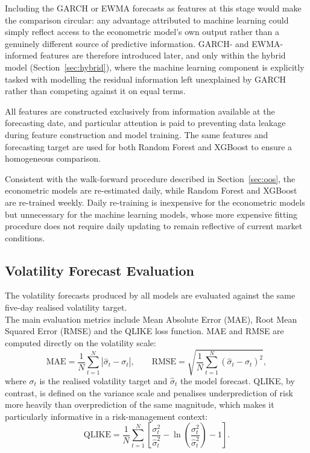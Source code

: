 \documentclass[12pt,a4paper]{article}
\begin{document}
Including the GARCH or EWMA forecasts as features at this stage would make the comparison circular:
any advantage attributed to machine learning could simply reflect access to the econometric model's
own output rather than a genuinely different source of predictive information. GARCH- and
EWMA-informed features are therefore introduced later, and only within the hybrid model
(Section~\ref{sec:hybrid}), where the machine learning component is explicitly tasked with modelling
the residual information left unexplained by GARCH rather than competing against it on equal terms.

All features are constructed exclusively from information available at the forecasting date, and
particular attention is paid to preventing data leakage during feature construction and model
training. The same features and forecasting target are used for both Random Forest and XGBoost to
ensure a homogeneous comparison.

Consistent with the walk-forward procedure described in Section~\ref{sec:oos}, the econometric
models are re-estimated daily, while Random Forest and XGBoost are re-trained weekly. Daily
re-training is inexpensive for the econometric models but unnecessary for the machine learning
models, whose more expensive fitting procedure does not require daily updating to remain reflective
of current market conditions.

\subsection{Volatility Forecast Evaluation}
The volatility forecasts produced by all models are evaluated against the same five-day realised
volatility target. \\
The main evaluation metrics include Mean Absolute Error (MAE), Root Mean Squared Error (RMSE)
and the QLIKE loss function. MAE and RMSE are computed directly on the volatility scale:\\
\begin{equation}
\text{MAE} = \frac{1}{N}\sum_{t=1}^{N} \left| \hat{\sigma}_t - \sigma_t \right|,
\qquad
\text{RMSE} = \sqrt{\frac{1}{N}\sum_{t=1}^{N} \left( \hat{\sigma}_t - \sigma_t \right)^2},
\end{equation}
where $\sigma_t$ is the realised volatility target and $\hat{\sigma}_t$ the model forecast.
QLIKE, by contrast, is defined on the variance scale and penalises underprediction of risk more
heavily than overprediction of the same magnitude, which makes it particularly informative in a
risk-management context:
\begin{equation}
\text{QLIKE} = \frac{1}{N}\sum_{t=1}^{N} \left[ \frac{\sigma_t^2}{\hat{\sigma}_t^2} - \ln\left(\frac{\sigma_t^2}{\hat{\sigma}_t^2}\right) - 1 \right].
\end{equation}
\end{document}
